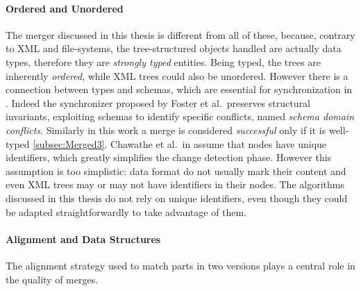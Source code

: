 \documentclass[../Thesis.tex]{subfiles}
\begin{document}
	\paragraph{Ordered and Unordered}
	The merger discussed in this thesis is different from all of these, because,
	contrary to XML and file-systems, the tree-structured objects handled
	are actually data types, therefore they are \emph{strongly typed} entities.
	Being typed, the trees are inherently \emph{ordered}, while XML trees
	could also be unordered. 
	However there is a connection between types and schemas, 
	which are essential for synchronization in \cite{Pierce07}.
	Indeed the synchronizer proposed by Foster et al.\ preserves structural 
	invariants,  exploiting schemas to identify specific conflicts, 
	named \emph{schema domain conflicts}. Similarly in this work a
	merge is considered \emph{successful} only if it is well-typed 
	\ref{subsec:Merged3}. 
	Chawathe et al.\ in \cite{Chawathe96} assume that nodes have unique 
	identifiers, which	greatly simplifies the change detection phase.
	However this assumption is too simplistic: data format do not usually mark
	their content and even XML trees may or may not have  
	identifiers in their nodes. The algorithms discussed in this thesis do
	not rely on unique identifiers, even though they could be adapted 
	straightforwardly to take advantage of them.
	
	\paragraph{Alignment and Data Structures}
	The alignment strategy used to match parts in two versions plays
	a central role in the quality of merges.
\end{document}
